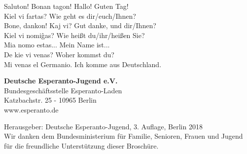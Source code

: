 \documentclass{leaflet}
\begin{document}
{
Saluton! Bonan tagon! \hfill Hallo! Guten Tag!\\
Kiel vi fartas?       \hfill Wie geht es dir/euch/Ihnen?\\
Bone, dankon! Kaj vi? \hfill Gut danke, und dir/Ihnen?\\
Kiel vi nomiĝas?      \hfill Wie heißt du/ihr/heißen Sie?\\
Mia nomo estas...     \hfill Mein Name ist...\\
De kie vi venas?      \hfill Woher kommst du?\\
Mi venas el Germanio. \hfill Ich komme aus Deutschland.
}
	
\begin{framed}
{\centering
\textbf{Deutsche Esperanto-Jugend e.V.} \\
Bundesgeschäftsstelle Esperanto-Laden\\
Katzbachstr. 25 - 10965 Berlin\\
www.esperanto.de\\
}
\end{framed}

\vspace{-.4cm}

{\footnotesize Herausgeber: Deutsche Esperanto-Jugend, 3. Auflage, Berlin 2018 \\
Wir danken dem Bundesministerium für Familie, Senioren, Frauen und Jugend für die freundliche Unterstützung dieser Broschüre. }


\noindent
{}%
\end{document}
